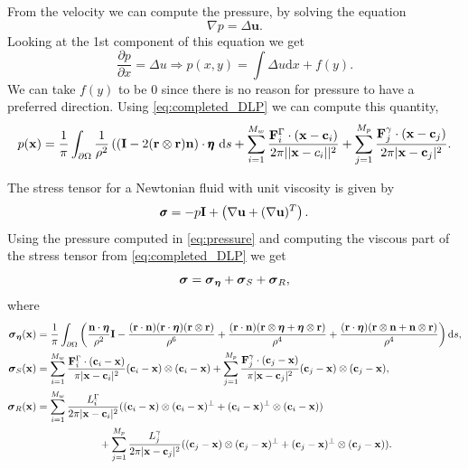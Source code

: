 \documentclass[preprint, 10pt]{elsarticle}
\begin{document}
From the velocity we can compute the pressure, by solving the equation
\begin{equation*}\nabla p = \Delta \mathbf{u} .\end{equation*}
Looking at the 1st component of this equation we get
\begin{equation*}\frac{\partial p}{\partial x} = \Delta u \Rightarrow p(x,y) = \int \Delta u \text{d}x + f(y).\end{equation*}
We can take $f(y)$ to be 0 since there is no reason for pressure to have a preferred direction. Using \eqref{eq:completed_DLP} we can compute this quantity,
\begin{equation}\label{eq:pressure} p({\mathbf{x}}) = \frac{1}{\pi}\int_{\partial\Omega}\frac{1}{\rho^2}\left(( \mathbf{I} - 2({\mathbf{r}} \otimes {\mathbf{r}}){\mathbf{n}}\right)\cdot\pmb{\eta}~\text{d}s + \sum\limits_{i=1}^{M_w} \frac{\mathbf{F}_i^\Gamma\cdot(\mathbf{x}-\mathbf{c}_i)}{2\pi||\mathbf{x}-c_i||^2}  + \sum\limits_{j=1}^{M_p} \frac{\mathbf{F}_j^\gamma\cdot(\mathbf{x}-\mathbf{c}_j)}{2\pi|\mathbf{x}-{\mathbf{c}}_j|^2}.\end{equation}


The stress tensor for a Newtonian fluid with unit viscosity is given by
\begin{equation*} \pmb{\sigma} = -p \mathbf{I} + \left(\nabla {\mathbf{u}} + (\nabla{\mathbf{u}})^T\right).\end{equation*}
Using the pressure computed in \eqref{eq:pressure} and computing the viscous part of the stress tensor from \eqref{eq:completed_DLP} we get
\begin{equation}\label{eq:stress} {\boldsymbol\sigma} = {\boldsymbol\sigma}_{{\boldsymbol\eta}} + {\boldsymbol\sigma}_{S} + {\boldsymbol\sigma}_{R},\end{equation}
where
\begin{align*}{\boldsymbol\sigma}_{{\boldsymbol\eta}}({\mathbf{x}}) &= \frac{1}{\pi}\int_{\partial\Omega}\left( \frac{{\mathbf{n}}\cdot{\boldsymbol\eta}}{\rho^2}\mathbf{I} -\frac{({\mathbf{r}}\cdot{\mathbf{n}})({\mathbf{r}}\cdot{\boldsymbol\eta})({\mathbf{r}}\otimes{\mathbf{r}})}{\rho^6} + \frac{({\mathbf{r}}\cdot{\mathbf{n}})({\mathbf{r}}\otimes{\boldsymbol\eta} + {\boldsymbol\eta}\otimes{\mathbf{r}})}{\rho^4} + \frac{({\mathbf{r}}\cdot{\boldsymbol\eta})({\mathbf{r}}\otimes{\mathbf{n}} + {\mathbf{n}}\otimes{\mathbf{r}})}{\rho^4}\right)\text{d}s,\\
{\boldsymbol\sigma}_S({\mathbf{x}}) &= \sum\limits_{i=1}^{M_w} \frac{\mathbf{F}_i^\Gamma\cdot(\mathbf{c}_i-\mathbf{x})}{\pi|\mathbf{x}-{\mathbf{c}}_i|^2}({\mathbf{c}}_i - {\mathbf{x}})\otimes({\mathbf{c}}_i-{\mathbf{x}})  + \sum\limits_{j=1}^{M_p} \frac{\mathbf{F}_j^\gamma\cdot(\mathbf{c}_j-\mathbf{x})}{\pi|\mathbf{x}-{\mathbf{c}}_j|^2}({\mathbf{c}}_j - {\mathbf{x}})\otimes({\mathbf{c}}_j-{\mathbf{x}}),\\
{\boldsymbol\sigma}_R({\mathbf{x}}) &= \sum\limits_{i=1}^{M_w} \frac{L_i^\Gamma}{2\pi|\mathbf{x}-{\mathbf{c}}_i|^2}(({\mathbf{c}}_i - {\mathbf{x}})\otimes({\mathbf{c}}_i-{\mathbf{x}})^\perp + ({\mathbf{c}}_i - {\mathbf{x}})^\perp\otimes({\mathbf{c}}_i-{\mathbf{x}}))  \\&\qquad\qquad\qquad + \sum\limits_{j=1}^{M_p}  \frac{L_j^\gamma}{2\pi|\mathbf{x}-{\mathbf{c}}_j|^2}(({\mathbf{c}}_j - {\mathbf{x}})\otimes({\mathbf{c}}_j-{\mathbf{x}})^\perp + ({\mathbf{c}}_j - {\mathbf{x}})^\perp\otimes({\mathbf{c}}_j-{\mathbf{x}})) .
\end{align*}
\end{document}
